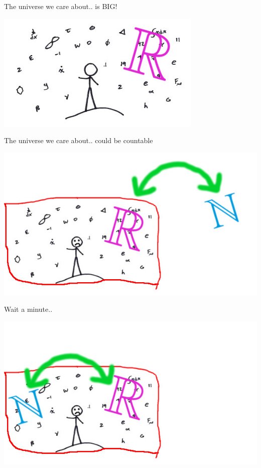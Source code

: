 \begin{frame}{The universe we care about.. is BIG!}
  \begin{center}
    \includegraphics[scale=1.5]{gfx/maths_universe_2.jpeg}
  \end{center}
\end{frame}


\begin{frame}{The universe we care about.. could be countable}
  \begin{center}
    \includegraphics[scale=1]{gfx/maths_universe_3.jpeg}
  \end{center}
\end{frame}


\begin{frame}{Wait a minute..}
  \begin{center}
    \includegraphics[scale=1]{gfx/maths_universe_4.jpeg}
  \end{center}
\end{frame}


